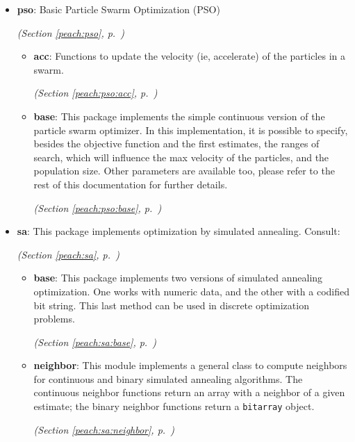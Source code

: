 \begin{itemize}
\begin{itemize}
  \end{itemize}
\item \textbf{pso}: 
Basic Particle Swarm Optimization (PSO)


  \textit{(Section \ref{peach:pso}, p.~\pageref{peach:pso})}

  \begin{itemize}
\setlength{\parskip}{0ex}
    \item \textbf{acc}: 
Functions to update the velocity (ie, accelerate) of the particles in a swarm.


  \textit{(Section \ref{peach:pso:acc}, p.~\pageref{peach:pso:acc})}

    \item \textbf{base}: 
This package implements the simple continuous version of the particle swarm
optimizer. In this implementation, it is possible to specify, besides the
objective function and the first estimates, the ranges of search, which will
influence the max velocity of the particles, and the population size. Other
parameters are available too, please refer to the rest of this documentation for
further details.


  \textit{(Section \ref{peach:pso:base}, p.~\pageref{peach:pso:base})}

  \end{itemize}
\item \textbf{sa}: 
This package implements optimization by simulated annealing. Consult:


  \textit{(Section \ref{peach:sa}, p.~\pageref{peach:sa})}

  \begin{itemize}
\setlength{\parskip}{0ex}
    \item \textbf{base}: 
This package implements two versions of simulated annealing optimization. One
works with numeric data, and the other with a codified bit string. This last
method can be used in discrete optimization problems.


  \textit{(Section \ref{peach:sa:base}, p.~\pageref{peach:sa:base})}

    \item \textbf{neighbor}: 
This module implements a general class to compute neighbors for continuous and
binary simulated annealing algorithms. The continuous neighbor functions return
an array with a neighbor of a given estimate; the binary neighbor functions
return a \texttt{bitarray} object.


  \textit{(Section \ref{peach:sa:neighbor}, p.~\pageref{peach:sa:neighbor})}

  \end{itemize}
\end{itemize}



